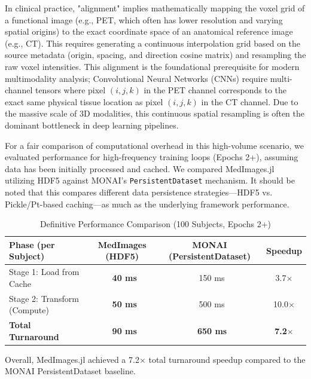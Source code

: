 \documentclass[10pt,letterpaper]{article}
\begin{document}
In clinical practice, "alignment" implies mathematically mapping the voxel grid of a functional image (e.g., PET, which often has lower resolution and varying spatial origins) to the exact coordinate space of an anatomical reference image (e.g., CT). This requires generating a continuous interpolation grid based on the source metadata (origin, spacing, and direction cosine matrix) and resampling the raw voxel intensities. This alignment is the foundational prerequisite for modern multimodality analysis; Convolutional Neural Networks (CNNs) require multi-channel tensors where pixel $(i,j,k)$ in the PET channel corresponds to the exact same physical tissue location as pixel $(i,j,k)$ in the CT channel. Due to the massive scale of 3D modalities, this continuous spatial resampling is often the dominant bottleneck in deep learning pipelines.

For a fair comparison of computational overhead in this high-volume scenario, we evaluated performance for high-frequency training loops (Epochs 2+), assuming data has been initially processed and cached. We compared MedImages.jl utilizing HDF5 against MONAI's \texttt{PersistentDataset} mechanism. It should be noted that this compares different data persistence strategies—HDF5 vs. Pickle/Pt-based caching—as much as the underlying framework performance.

\begin{table}[H]
\centering
\caption{Definitive Performance Comparison (100 Subjects, Epochs 2+)}
\begin{tabular}{|l|c|c|c|}
\hline
\textbf{Phase (per Subject)} & \textbf{MedImages (HDF5)} & \textbf{MONAI (PersistentDataset)} & \textbf{Speedup} \\
\hline
Stage 1: Load from Cache & \textbf{~40 ms} & ~150 ms & 3.7$\times$ \\
Stage 2: Transform (Compute) & \textbf{~50 ms} & ~500 ms & 10.0$\times$ \\
\hline
\textbf{Total Turnaround} & \textbf{~90 ms} & \textbf{~650 ms} & \textbf{7.2$\times$} \\
\hline
\end{tabular}
\label{tab:scaling_comparison}
\end{table}

Overall, MedImages.jl achieved a 7.2$\times$ total turnaround speedup compared to the MONAI PersistentDataset baseline.
\end{document}

